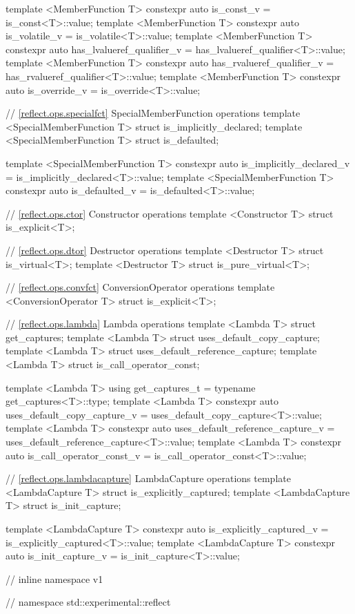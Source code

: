 \begin{std.txt}
\begin{codeblock}
{{template <MemberFunction T>
  constexpr auto is_const_v = is_const<T>::value;
template <MemberFunction T>
  constexpr auto is_volatile_v = is_volatile<T>::value;
template <MemberFunction T>
  constexpr auto has_lvalueref_qualifier_v = has_lvalueref_qualifier<T>::value;
template <MemberFunction T>
  constexpr auto has_rvalueref_qualifier_v = has_rvalueref_qualifier<T>::value;
template <MemberFunction T>
  constexpr auto is_override_v = is_override<T>::value;

// \ref{reflect.ops.specialfct} SpecialMemberFunction operations
template <SpecialMemberFunction T> struct is_implicitly_declared;
template <SpecialMemberFunction T> struct is_defaulted;

template <SpecialMemberFunction T>
  constexpr auto is_implicitly_declared_v = is_implicitly_declared<T>::value;
template <SpecialMemberFunction T>
  constexpr auto is_defaulted_v = is_defaulted<T>::value;

// \ref{reflect.ops.ctor} Constructor operations
template <Constructor T> struct is_explicit<T>;

// \ref{reflect.ops.dtor} Destructor operations
template <Destructor T> struct is_virtual<T>;
template <Destructor T> struct is_pure_virtual<T>;

// \ref{reflect.ops.convfct} ConversionOperator operations
template <ConversionOperator T> struct is_explicit<T>;

// \ref{reflect.ops.lambda} Lambda operations
template <Lambda T> struct get_captures;
template <Lambda T> struct uses_default_copy_capture;
template <Lambda T> struct uses_default_reference_capture;
template <Lambda T> struct is_call_operator_const;

template <Lambda T>
  using get_captures_t = typename get_captures<T>::type;
template <Lambda T>
  constexpr auto uses_default_copy_capture_v = uses_default_copy_capture<T>::value;
template <Lambda T>
  constexpr auto uses_default_reference_capture_v = uses_default_reference_capture<T>::value;
template <Lambda T>
  constexpr auto is_call_operator_const_v = is_call_operator_const<T>::value;

// \ref{reflect.ops.lambdacapture} LambdaCapture operations
template <LambdaCapture T> struct is_explicitly_captured;
template <LambdaCapture T> struct is_init_capture;

template <LambdaCapture T>
  constexpr auto is_explicitly_captured_v = is_explicitly_captured<T>::value;
template <LambdaCapture T>
  constexpr auto is_init_capture_v = is_init_capture<T>::value;

} // inline namespace v1
} // namespace std::experimental::reflect
\end{codeblock}
\end{std.txt}

